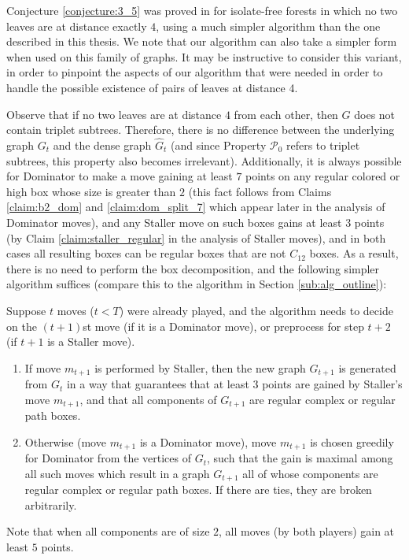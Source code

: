 \documentclass[11pt]{article}
\def\dnsitem{\vspace{-7pt}\item}
\theoremstyle{definition}
\def\propt1{\mathcal{P}_0}
\begin{document}
Conjecture \ref{conjecture:3_5} was proved in \cite{bujtas2015domination} for isolate-free forests in which no two leaves are at distance exactly $4$, using a much simpler algorithm than the one described in this thesis.
We note that our algorithm can also take a simpler form when used on this family of graphs.
It may be instructive to consider this variant, in order to pinpoint the aspects of our algorithm that were needed in order to handle the possible existence of pairs of leaves at distance 4.

Observe that if no two leaves are at distance $4$ from each other, then $G$ does not contain triplet subtrees.
Therefore, there is no difference between the underlying graph $G_t$ and the dense graph $\hat{G}_t$ (and since Property $\propt1$ refers to triplet subtrees, this property also becomes irrelevant).
Additionally, it is always possible for Dominator to make a move gaining at least $7$ points on any regular colored or high box whose size is greater than $2$ (this fact follows from Claims \ref{claim:b2_dom} and \ref{claim:dom_split_7} which appear later in the analysis of Dominator moves), and any Staller move on such boxes gains at least $3$ points (by Claim \ref{claim:staller_regular} in the analysis of Staller moves),
and in both cases all resulting boxes can be regular boxes that are not $C_{12}$ boxes.
As a result, there is no need to perform the box decomposition, and the following simpler algorithm suffices (compare this to the algorithm in Section \ref{sub:alg_outline}):

Suppose $t$ moves ($t < T$) were already played, and the algorithm needs to decide on the $(t+1)$st move (if it is a Dominator move), or preprocess for step $t+2$ (if $t+1$ is a Staller move).
\begin{enumerate}
	\dnsitem If move $m_{t+1}$ is performed by Staller, then the new graph $G_{t+1}$ is generated from $G_t$ in a way that guarantees that at least $3$ points are gained 
	by Staller's move $m_{t+1}$, 
	and that all components of $G_{t+1}$ are regular complex or regular path boxes.

	\dnsitem 
	Otherwise (move $m_{t+1}$ is a Dominator move),
	move $m_{t+1}$ is chosen greedily for Dominator from the vertices of $G_t$,
	such that the gain is maximal among all such moves which result in a graph $G_{t+1}$ all of whose components are regular complex or regular path boxes. 
	If there are ties, they are broken arbitrarily.	
\end{enumerate}
Note that when all components are of size $2$, all moves (by both players) gain at least $5$ points.
\end{document}
